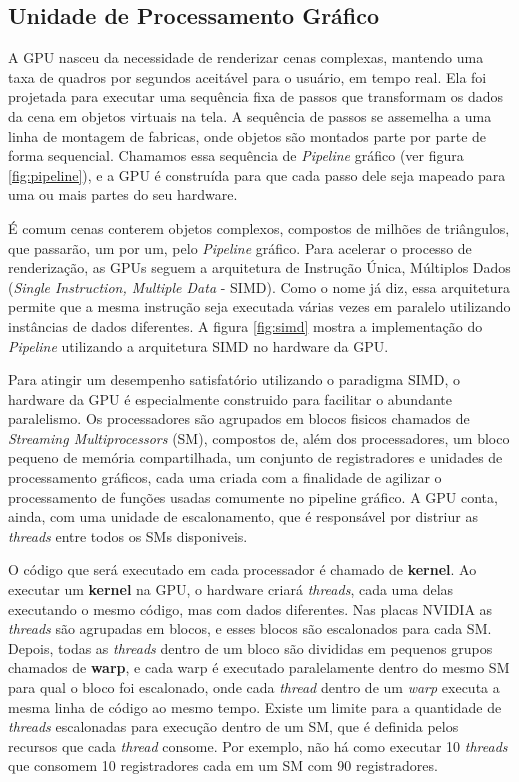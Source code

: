 \subsection{Unidade de Processamento Gráfico}\label{GPU}
    A GPU nasceu da necessidade de renderizar cenas complexas, mantendo uma taxa de quadros por segundos
aceitável para o usuário, em tempo real. Ela foi projetada para executar uma sequência fixa de passos que transformam
os dados da cena em objetos virtuais na tela. A sequência de passos se assemelha a uma linha de montagem de fabricas,
onde objetos são montados parte por parte de forma sequencial. Chamamos essa sequência de \textit{Pipeline} gráfico
(ver figura \ref{fig:pipeline}), e a GPU é construída para que cada passo dele seja mapeado para uma ou mais partes do
seu hardware.

    É comum cenas conterem objetos complexos, compostos de milhões de triângulos, que passarão, um por um, pelo
\textit{Pipeline} gráfico. Para acelerar o processo de renderização, as GPUs seguem a arquitetura de Instrução Única,
Múltiplos Dados (\textit{Single Instruction, Multiple Data} - SIMD). Como o nome já diz, essa arquitetura permite que
a mesma instrução seja executada várias vezes em paralelo utilizando instâncias de dados diferentes. A figura
\ref{fig:simd} mostra a implementação do \textit{Pipeline} utilizando a arquitetura SIMD no hardware da GPU.

  Para atingir um desempenho satisfatório utilizando o paradigma SIMD, o hardware
da GPU é especialmente construido para facilitar o abundante paralelismo. Os
processadores são agrupados em blocos fisicos chamados de \textit{Streaming Multiprocessors} (SM),
compostos de, além dos processadores, um bloco pequeno de memória compartilhada,
um conjunto de registradores e unidades de processamento gráficos, cada uma criada
com a finalidade de agilizar o processamento de funções usadas comumente no pipeline
gráfico. A GPU conta, ainda, com uma unidade de escalonamento, que é responsável
por distriur as \textit{threads} entre todos os SMs disponiveis.

    O código que será executado em cada processador é chamado de \textbf{kernel}. Ao executar um \textbf{kernel} na GPU, o
hardware criará \textit{threads}, cada uma delas executando o mesmo código, mas com dados diferentes. Nas placas NVIDIA as \textit{threads}
são agrupadas em blocos, e esses blocos são escalonados para cada SM. Depois, todas as \textit{threads} dentro de um bloco são
divididas em pequenos grupos chamados de \textbf{warp}, e cada warp é executado paralelamente dentro do
mesmo SM para qual o bloco foi escalonado, onde cada \textit{thread} dentro de um \textit{warp} executa a mesma linha de código ao mesmo tempo.
Existe um limite para a quantidade de \textit{threads} escalonadas para execução
dentro de um SM, que é definida pelos recursos que cada \textit{thread} consome. Por exemplo, não há como executar 10 \textit{threads}
que consomem 10 registradores cada em um SM com 90 registradores.

